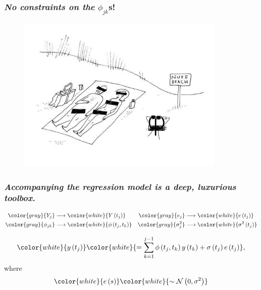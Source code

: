 \documentclass[12pt]{beamer}
\newcommand{\makegrey}[1]{{ \color{gray} {#1}}}
\newcommand{\makewhite}[1]{{ \color{white} {#1}}}
\newcommand\myfootnote[1]{%
  \begingroup
  \renewcommand\thefootnote{}\footnote{#1}%
  \addtocounter{footnote}{-1}%
  \endgroup
}
\begin{document}
\begin{frame}
\frametitle{\emph{No constraints on the} $\phi_{jk}$s!}

\begin{adjustwidth}{-3cm}{-3cm}
\begin{center}
\begin{figure}
\graphicspath{{img/}}
  \includegraphics[height=7.5cm]{nude-beach}
\end{figure}
\end{center}
  \end{adjustwidth}
\end{frame}





\begin{frame}
\frametitle{\emph{Accompanying the regression model is a deep, luxurious toolbox.}}

\begin{align*}
\makegrey{Y_j}  	&\longrightarrow \makewhite{Y\left( t_j \right) }		&	 \makegrey{e_j} 		&\longrightarrow \makewhite{e\left( t_j \right)}\\
\makegrey{\phi_{jk}} &\longrightarrow \makewhite{\phi\left(t_j,t_k\right)} 	& 	\makegrey{\sigma^2_{j}} &\longrightarrow \makewhite{\sigma^2\left(t_j\right)}
\end{align*}
\noindent


\begin{equation}  \label{eq:MyModel}  
\makewhite{y\left(t_j \right)}  \makewhite{= \sum_{k=1}^{j-1} \phi\left(t_j ,t_k\right) y\left(t_k\right) + \sigma\left(t_j\right)e\left({t_j}\right)},
\end{equation}
\noindent
where
\begin{equation*} 
\makewhite{e\left(s\right)} \makewhite{ \sim  \mathcal{N}\left(0,\sigma^2 \right)}
\end{equation*}


\end{frame}
\end{document}
